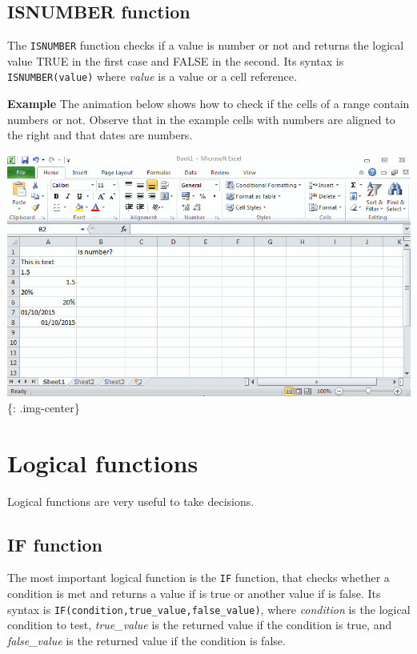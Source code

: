 \section{ISNUMBER function}
\label{isnumberfunction}

The \texttt{ISNUMBER} function checks if a value is number or not and returns the logical value TRUE in the first case and FALSE in the second. Its syntax is \texttt{ISNUMBER(value)} where \emph{value} is a value or a cell reference.

\textbf{Example} The animation below shows how to check if the cells of a range contain numbers or not. Observe that in the example cells with numbers are aligned to the right and that dates are numbers. 

\includegraphics[keepaspectratio,width=\textwidth,height=0.75\textheight]{img/example_function_isnumber.gif}
\{: .img-center\}

\chapter{Logical functions}
\label{logicalfunctions}

Logical functions are very useful to take decisions. 

\section{IF function}
\label{iffunction}

The most important logical function is the \texttt{IF} function, that checks whether a condition is met and returns a value if is true or another value if is false. Its syntax is \texttt{IF(condition,true\_value,false\_value)}, where \emph{condition} is the logical condition to test, \emph{true\_value} is the returned value if the condition is true, and \emph{false\_value} is the returned value if the condition is false. 

